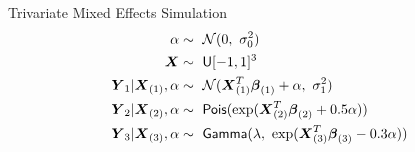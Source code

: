 \documentclass[9pt,notes=hide]{beamer}
\newcommand{\vect}[1]{\boldsymbol #1}
\newcommand{\vbe}{\vect{\beta}}
\newcommand{\X}{\vect{X}}
\newcommand{\Y}{\vect{Y}}
\begin{document}
\begin{frame}{Trivariate Mixed Effects Simulation}
	\begin{align*}
		\alpha                & \sim  \  \mathcal{N}(0,  \ \sigma_0^2)\nonumber                                     \\
		\X                    & \sim   \ {\sf U}[-1, 1]^3  \nonumber                                                \\
		\Y_1|\X_{(1)}, \alpha & \sim  \  \mathcal{N}(\X_{(1)}^T\vbe_{(1)} + \alpha,  \ \sigma_1^2)                  \\
		\Y_2|\X_{(2)}, \alpha & \sim   \ {\sf Pois}(\exp(\X_{(2)}^T\vbe_{(2)}  + 0.5\alpha))\nonumber               \\
		\Y_3|\X_{(3)}, \alpha & \sim  \ {\sf Gamma}(\lambda, \  \exp(\X_{(3)}^T\vbe_{(3)}   - 0.3\alpha)) \nonumber
	\end{align*}
\end{frame}
\end{document}
